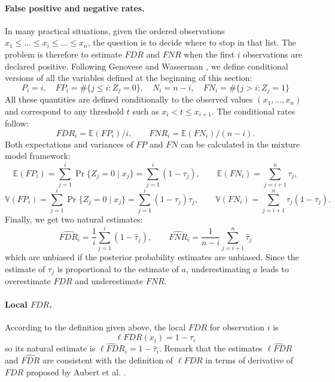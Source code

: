 \documentclass[10pt]{article}
\newcommand{\Esp}{{\mathbb E}}
\newcommand{\Var}{{\mathbb V}}
\newcommand{\lFDR}{\ell FDR}
\begin{document}
\paragraph{False positive and negative rates.}
In many practical situations, given the ordered observations $x_1 \leq \dots \leq x_i \leq \dots \leq x_n$, the question is to decide where to stop in that
list. The problem is therefore to estimate $FDR$ and $FNR$ when the first $i$ observations are declared positive. Following Genovese and Wasserman
\cite{GeW02,GeW04}, we define conditional versions of all the variables defined at the beginning of this section:
$$
P_i = i, \quad
FP_i = \#\{j \leq i: Z_j = 0\}, \quad
N_i = n-i, \quad
FN_i = \#\{j > i: Z_j = 1\}
$$
All these quantities are defined conditionally to the observed
values $(x_1, \dots, x_n)$ and correspond to any threshold $t$ such as
$x_i < t \leq x_{i+1}$.  The conditional rates follow:
\begin{equation} \label{Eq:FDRiFNRi}
  FDR_i = \Esp(FP_i) / i,
  \qquad
  FNR_i = \Esp(FN_i) / (n-i).
\end{equation}
Both expectations and variances of $FP$ and $FN$ can be calculated in
the mixture model framework:
$$
\Esp(FP_i) = \sum_{j=1}^i \Pr\{Z_j = 0 \;|\; x_j\} = \sum_{j=1}^i (1-\tau_j), \qquad \Esp(FN_i) = \sum_{j=i+1}^n \tau_j,
$$
$$
\Var(FP_i) = \sum_{j=1}^i \Pr\{Z_j = 0 \;|\; x_j\} = \sum_{j=1}^i (1-\tau_j) \tau_j, \qquad \Var(FN_i) = \sum_{j=i+1}^n \tau_j (1- \tau_j).
$$
Finally, we get two natural estimates:
$$
\widehat{FDR}_i = \frac1i \sum_{j=1}^i (1-\widehat{\tau}_j),
\qquad
\widehat{FNR}_i = \frac1{n-i} \sum_{j=i+1}^n \widehat{\tau}_j
$$
which are unbiased if the posterior probability
estimates are unbiased. Since the estimate of $\tau_j$ is proportional
to the estimate of $a$, underestimating $a$ leads to overestimate
$FDR$ and underestimate $FNR$.

\paragraph{Local $FDR$.} According to the definition given above, the
local $FDR$ for observation $i$ is
$$
\lFDR(x_i) = 1 - \tau_i
$$
so its natural estimate is $\widehat{\lFDR}_i = 1 - \widehat{\tau}_i$. Remark that the estimates $\widehat{\lFDR}$ and $\widehat{FDR}$ are consistent with the
definition of $\lFDR$ in terms of derivative of $FDR$ proposed by Aubert et al. \cite{ABD04}.

\end{document}
